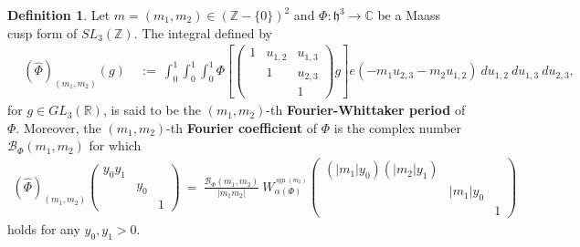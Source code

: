 \documentclass[11pt,reqno]{amsart}
\theoremstyle{definition}
\theoremstyle{definition}
\newtheorem{defi}[thm]{Definition}
\theoremstyle{remark}
\newcommand{\R}{\ensuremath{\mathbb{R}}}
\newcommand{\C}{\ensuremath{\mathbb{C}}}
\newcommand{\Z}{\ensuremath{\mathbb{Z}}}
\numberwithin{equation}{section}
\DeclareMathOperator{\sgn}{sgn}
\begin{document}
\begin{defi}\label{fourcoeff}
	Let $m=(m_{1}, m_{2})\in (\Z-\{0\})^{2}$ and $\Phi:  \mathfrak{h}^3 \rightarrow \C$ be a Maass cusp form of $SL_{3}(\Z)$. 	The integral defined by
	\begin{align}\label{fourcoeff2}
	\hspace{10pt} (\widehat{\Phi})_{(m_{1}, m_{2})}(g)\ &:= \ \int_{0}^{1} \int_{0}^{1}\int_{0}^{1} \Phi\left[ \begin{pmatrix}
	1 & u_{1,2} & u_{1,3} \\
	&     1      & u_{2,3} \\
	&             & 1
	\end{pmatrix} 
	g\right]   e\left(-m_{1} u_{2,3}-m_{2} u_{1,2} \right) \ du_{1,2} \ du_{1,3} \ du_{2,3},
	\end{align}
for $g\in GL_{3}(\R)$,  is said to be the  $(m_{1}, m_{2})$-th \textbf{Fourier-Whittaker period} of $\Phi$. 
Moreover,  the $(m_{1}, m_{2})$-th \textbf{Fourier coefficient} of $\Phi$ is the complex number $\mathcal{B}_{\Phi}(m_{1}, m_{2})$  for which
	\begin{align}\label{fourmulone}
		(\widehat{\Phi})_{(m_{1}, m_{2})}	\begin{pmatrix}
		y_{0}y_{1} &          &       \\
		& y_{0} &       \\
		&          &  1
		\end{pmatrix} \ = \  \frac{\mathcal{B}_{\Phi}(m_{1}, m_{2})}{|m_{1}m_{2}|} \  W_{\alpha(\Phi)}^{^{\sgn(m_{2})}}\begin{pmatrix}
		(|m_{1}|y_{0})(|m_{2}|y_{1}) &          &       \\
		& |m_{1}|y_{0} &       \\
		&          &  1
		\end{pmatrix}
	 \end{align}
     holds for any  $y_{0}, y_{1}>0$.   
\end{defi}
\end{document}
